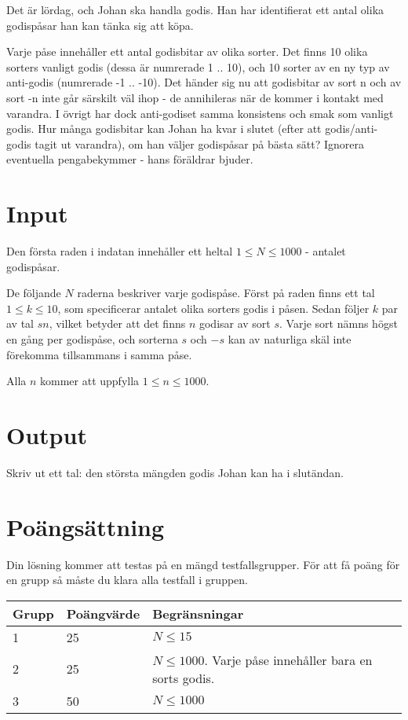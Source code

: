 
Det är lördag, och Johan ska handla godis. Han har identifierat ett antal olika godispåsar han kan tänka sig att köpa.

Varje påse innehåller ett antal godisbitar av olika sorter. Det finns 10 olika sorters vanligt godis (dessa är numrerade 1 .. 10), och 10 sorter av en ny typ av anti-godis (numrerade -1 .. -10). Det händer sig nu att godisbitar av sort n och av sort -n inte går särskilt väl ihop - de annihileras när de kommer i kontakt med varandra. I övrigt har dock anti-godiset samma konsistens och smak som vanligt godis. Hur många godisbitar kan Johan ha kvar i slutet (efter att godis/anti-godis tagit ut varandra), om han väljer godispåsar på bästa sätt? Ignorera eventuella pengabekymmer - hans föräldrar bjuder.

\section*{Input}

Den första raden i indatan innehåller ett heltal $1 \le N \le 1000$ - antalet godispåsar.

De följande $N$ raderna beskriver varje godispåse.
Först på raden finns ett tal $1 \le k \le 10$, som specificerar antalet olika sorters godis i påsen.
Sedan följer $k$ par av tal $s n$, vilket betyder att det finns $n$ godisar av sort $s$.
Varje sort nämns högst en gång per godispåse, och sorterna $s$ och $-s$ kan av naturliga skäl inte förekomma tillsammans i samma påse.

Alla $n$ kommer att uppfylla $1 \le n \le 1000$.

\section*{Output}

Skriv ut ett tal: den största mängden godis Johan kan ha i slutändan.


\section*{Poängsättning}
Din lösning kommer att testas på en mängd testfallsgrupper. För att få poäng för en grupp så måste du klara alla testfall i gruppen.

\begin{tabular}{| l | l | l |}
	\hline
	Grupp & Poängvärde & Begränsningar\\ \hline
  1     & 25         & $N \le 15$ \\ \hline
  2     & 25         & $N \le 1000$. Varje påse innehåller bara en sorts godis. \\ \hline
  3     & 50         & $N \le 1000$ \\ \hline
\end{tabular}
